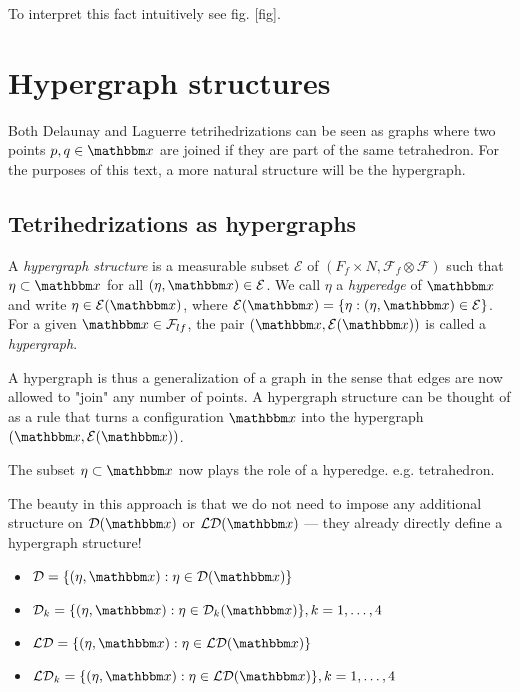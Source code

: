 To interpret this fact intuitively see fig. [fig]. 







\section{Hypergraph structures}
Both Delaunay and Laguerre tetrihedrizations can be seen as graphs where two points $p,q\in\x$ are joined if they are part of the same tetrahedron. For the purposes of this text, a more natural structure will be the hypergraph.

\subsection{Tetrihedrizations as hypergraphs}
 
\begin{definition}
	A \textit{hypergraph structure} is a measurable subset $\mathcal E$ of $(F_f\times N, \mathcal F_f \otimes \mathcal F)$ such that $\eta \subset \x$ for all $(\eta,\x)\in\mathcal E$. We call $\eta$ a \textit{hyperedge} of $\x$ and write $\eta \in \mathcal E(\x)$, where $\mathcal E(\x) = \{\eta: (\eta,\x) \in \mathcal E\}$. For a given $\x \in \mathcal F_{lf}$, the pair $(\x, \mathcal E(\x))$ is called a \textit{hypergraph}.
\end{definition}
A hypergraph is thus a generalization of a graph in the sense that edges are now allowed to "join" any number of points. A hypergraph structure can be thought of as a rule that turns a configuration $\x$ into the hypergraph $(\x,\mathcal E(\x))$. 

The subset $\eta \subset \x$ now plays the role of a hyperedge. e.g. tetrahedron.

The beauty in this approach is that we do not need to impose any additional structure on $\mathcal D(\x)$ or $\mathcal {LD}(\x)$ --- they already directly define a hypergraph structure! 

\begin{definition}
	\begin{itemize}
		\item $\mathcal D = \{(\eta,\x): \eta \in \mathcal D(\x)\}$
		\item 	$\mathcal D_k = \{(\eta,\x): \eta \in \mathcal D_k(\x)\}, k=1,\dots,4$
		\item 	$\mathcal {LD} = \{(\eta,\x): \eta \in \mathcal {LD}(\x)\}$
		\item 	$\mathcal {LD}_k = \{(\eta,\x): \eta \in \mathcal {LD}(\x)\}, k=1,\dots,4$
	\end{itemize}
\end{definition}


